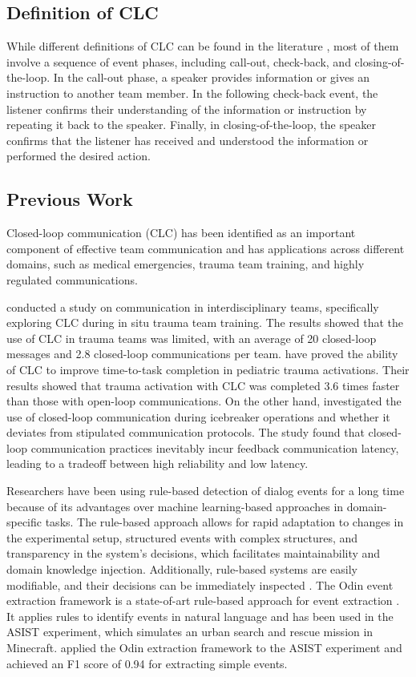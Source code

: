 \documentclass[11pt]{article}
\begin{document}
\subsection{Definition of CLC}
While different definitions of CLC can be found in the literature \citep{marzuki2019closed, hargestam2016trauma, abd2018closed, bostrom2020mind}, most of them involve a sequence of event phases, including call-out, check-back, and closing-of-the-loop. In the call-out phase, a speaker provides information or gives an instruction to another team member. In the following check-back event, the listener confirms their understanding of the information or instruction by repeating it back to the speaker. Finally, in closing-of-the-loop, the speaker confirms that the listener has received and understood the information or performed the desired action. 

\subsection{Previous Work}
Closed-loop communication (CLC) has been identified as an important component of effective team communication and has applications across different domains, such as medical emergencies, trauma team training, and highly regulated communications. 

\citet{hargestam2016trauma} conducted a study on communication in interdisciplinary teams, specifically exploring CLC during in situ trauma team training. The results showed that the use of CLC in trauma teams was limited, with an average of 20 closed-loop messages and 2.8 closed-loop communications per team. \citet{abd2018closed} have proved the ability of CLC to improve time-to-task completion in pediatric trauma activations. Their results showed that trauma activation with CLC was completed 3.6 times faster than those with open-loop communications. On the other hand, \citet{bostrom2020mind} investigated the use of closed-loop communication during icebreaker operations and whether it deviates from stipulated communication protocols. The study found that closed-loop communication practices inevitably incur feedback communication latency, leading to a tradeoff between high reliability and low latency.

Researchers have been using rule-based detection of dialog events for a long time because of its advantages over machine learning-based approaches in domain-specific tasks. The rule-based approach allows for rapid adaptation to changes in the experimental setup, structured events with complex structures, and transparency in the system's decisions, which facilitates maintainability and domain knowledge injection. Additionally, rule-based systems are easily modifiable, and their decisions can be immediately inspected \citep{nitschke2022rule}. The Odin event extraction framework is a state-of-art rule-based approach for  event extraction \citep{valenzuela-escarcega-etal-2016-odins}. It applies rules to identify events in natural language and has been used in the ASIST experiment, which simulates an urban search and rescue mission in Minecraft. \citet{nitschke2022rule} applied the Odin extraction framework to the ASIST experiment and achieved an F1 score of 0.94 for extracting simple events.
\end{document}
